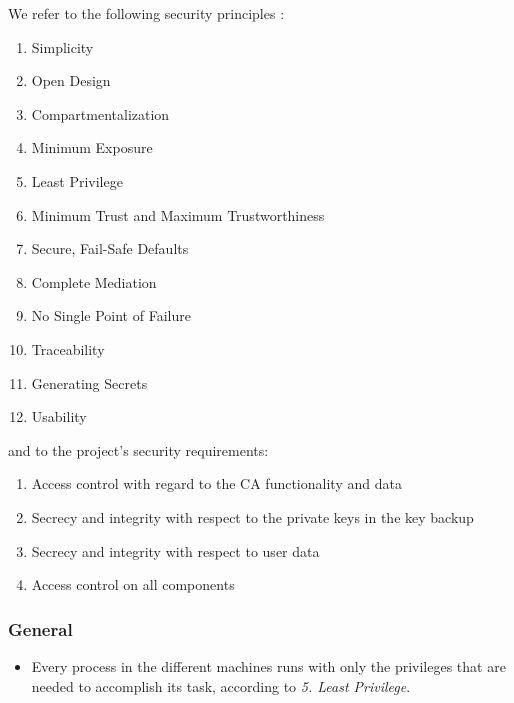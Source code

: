 \documentclass[english]{article}
\begin{document}
We refer to the following security principles \cite{ASL_book}:
\begin{enumerate}
\setlength\itemsep{0em}
\item Simplicity
\item Open Design
\item Compartmentalization
\item Minimum Exposure
\item Least Privilege
\item Minimum Trust and Maximum Trustworthiness
\item Secure, Fail-Safe Defaults
\item Complete Mediation
\item No Single Point of Failure
\item Traceability
\item Generating Secrets
\item Usability
\end{enumerate}
and to the project's security requirements:
\begin{enumerate}[label=\alph*.]
\setlength\itemsep{0em}
\item Access control with regard to the CA functionality and data
\item Secrecy and integrity with respect to the private keys in the key backup
\item Secrecy and integrity with respect to user data
\item Access control on all components
\end{enumerate}


\subsubsection{General}
\begin{itemize}
\item Every process in the different machines runs with only the privileges that are needed to accomplish its task, according to \emph{5. Least Privilege}.
\end{itemize}
\end{document}
